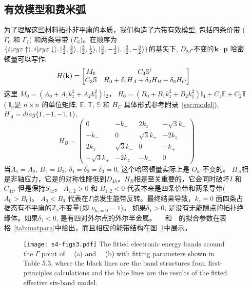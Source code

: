 \subsection{有效模型和费米弧}
为了理解这些材料拓扑非平庸的本质，我们构造了六带有效模型, 包括四条价带 ($\Gamma_6$ 和 $\Gamma_7$) 和两条导带 ($\Gamma_6$)。在顺序为 $\{i|xyz\uparrow\rangle,i|xyz\downarrow\rangle, |\frac{3}{2}, \frac{3}{2}\rangle, |\frac{3}{2}, \frac{1}{2}\rangle, |\frac{3}{2}, -\frac{1}{2}\rangle, \\|\frac{3}{2}, -\frac{3}{2}\rangle\}$的基矢下, $D_{2d}$-不变的$\bold{k\cdot p}$ 哈密顿量可以写作:
\begin{equation*}
    \begin{split}
        &H({\bf k}) = \begin{bmatrix}
            M_0& C_3{\mathbb S}^\dagger \\
            C_3{\mathbb S} & H_0+\delta_1 H_A+\delta_2 H_B +\delta_3H_C
        \end{bmatrix}
    \end{split}
\end{equation*}
这里 $M_0=\left(A_0+A_1k_z^2+A_2k_{||}^2\right) {\mathbb I}_{2}$，  $H_0=\left(B_0+B_1k_z^2+B_2k_{||}^2\right){\mathbb I}_{4}+C_1 {\mathbb E}+C_2{\mathbb T}$ ( $\mathbb I_n$是 $n\times n$ 的单位矩阵, $\mathbb E$, $\mathbb T$, $\mathbb S$ 和 $H_C$ 具体形式参考附录~\ref{sec:model}), $H_A= diag\{1,-1,-1,1\}$,
\begin{equation*}
  H_B = \begin{pmatrix}
      0 & -k_+ & 2k_z & -\sqrt{3}k_- \\
      -k_- & 0 & \sqrt{3}k_+ & -2k_z \\
      2k_z & \sqrt{3}k_- & 0 & -k_+ \\
      -\sqrt{3}k_+ & -2k_z & -k_- & 0
  \end{pmatrix}
\end{equation*}
当$A_1=A_2$, $B_1=B_2$, $\delta_1=\delta_2=\delta_3=0$, 这个哈密顿量实际上是 $O_h$-不变的。 $H_A$相是非轴应力，它是的对称性降低到$D_{4h}$。$H_B$相是至关重要的，它会同时破坏$I$ 和 $C_{4z}$, 但是保持$S_{4z}$。
$A_{1,2}>0$ 和 $B_{1,2}<0$ 代表本来是四条价带和两条导带($A_0>B_0$)。
$A_0<B_0$ 代表在$\Gamma$点发生能带反转。最终结果导致，$k_z=0$ 面四条占据态有不平庸的$\mathbb Z_2$不变量(即 $\nu_{k_z=0}=1$)。 %
如果$\delta_1>0$, 是没有无能隙点的拓扑绝缘体。如果$\delta_1<0$, 是有四对外尔点的外尔半金属。
~\tic~和~\wsmc~的拟合参数在表格~\ref{tab:matpara}中给出，而且相应的能带结构在图~\ref{fig:5-s3}中展示。
\begin{figure}[!htb]
    \centering
    \texttt{[image: s4-figs3.pdf]}
    {
    The fitted electronic energy bands around the $\Gamma$ point of ~\tic~(a) and ~\wsmc~(b) with fitting parameters shown in Table 5.3, where the black lines are the band structures from first-principles calculations and the blue lines are the results of the fitted effective six-band model. ~\citep{Qians4}
    }
    \label{fig:5-s3}
\end{figure}

